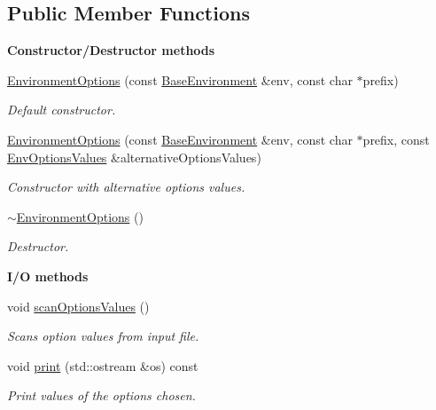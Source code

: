 \subsection*{Public Member Functions}
\begin{Indent}{\bf Constructor/\-Destructor methods}\par
\begin{DoxyCompactItemize}
\item 
\hyperlink{class_q_u_e_s_o_1_1_environment_options_a95407566e0b300fe1160713ba67d8291}{Environment\-Options} (const \hyperlink{class_q_u_e_s_o_1_1_base_environment}{Base\-Environment} \&env, const char $\ast$prefix)
\begin{DoxyCompactList}\small\item\em Default constructor. \end{DoxyCompactList}\item 
\hyperlink{class_q_u_e_s_o_1_1_environment_options_a9dbc6e4ec7bf564d81554782858bd53d}{Environment\-Options} (const \hyperlink{class_q_u_e_s_o_1_1_base_environment}{Base\-Environment} \&env, const char $\ast$prefix, const \hyperlink{class_q_u_e_s_o_1_1_env_options_values}{Env\-Options\-Values} \&alternative\-Options\-Values)
\begin{DoxyCompactList}\small\item\em Constructor with alternative options values. \end{DoxyCompactList}\item 
\hyperlink{class_q_u_e_s_o_1_1_environment_options_ac24ba491b4136c675b1ed26ab2ef06e0}{$\sim$\-Environment\-Options} ()
\begin{DoxyCompactList}\small\item\em Destructor. \end{DoxyCompactList}\end{DoxyCompactItemize}
\end{Indent}
\begin{Indent}{\bf I/\-O methods}\par
\begin{DoxyCompactItemize}
\item 
void \hyperlink{class_q_u_e_s_o_1_1_environment_options_a0748c6bd893d2ac90cd68d50b5abe211}{scan\-Options\-Values} ()
\begin{DoxyCompactList}\small\item\em Scans option values from input file. \end{DoxyCompactList}\item 
void \hyperlink{class_q_u_e_s_o_1_1_environment_options_aeb14f206c9bae6f9f0a5c0a46e306ec6}{print} (std\-::ostream \&os) const 
\begin{DoxyCompactList}\small\item\em Print values of the options chosen. \end{DoxyCompactList}\end{DoxyCompactItemize}
\end{Indent}
